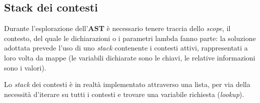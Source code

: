 \subsection{Stack dei contesti}
\label{sec:5-12-scope-stack}

Durante l'esplorazione dell'\textbf{AST} è necessario tenere traccia dello \textit{scope}, il contesto, del quale le dichiarazioni
o i parametri lambda fanno parte: la soluzione adottata prevede l'uso di uno \textit{stack} contenente i contesti attivi,
rappresentati a loro volta da mappe (le variabili dichiarate sono le chiavi, le relative informazioni sono i valori).

\noindent Lo \textit{stack} dei contesti è in realtà implementato attraverso una lista, per via della necessità d'iterare
su tutti i contesti e trovare una variabile richiesta (\textit{lookup}).

